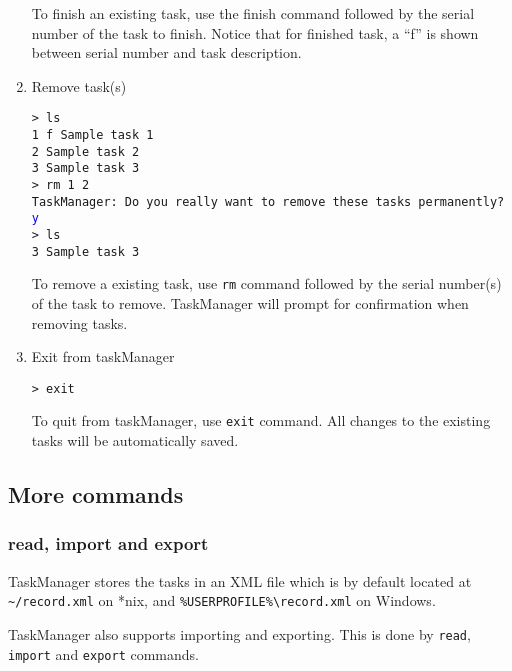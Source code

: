 \documentclass[12pt, a4paper]{article}
\begin{document}
\begin{enumerate}
To finish an existing task, use the finish command followed by the serial number of the task to finish. 
Notice that for finished task, a ``f'' is shown between serial number and task description.

\item Remove task(s)

\texttt{\textgreater \ ls\\
    1 f Sample task 1\\
    2   Sample task 2\\
    3   Sample task 3\\
    \textgreater \ rm 1 2\\
    TaskManager: Do you really want to remove these tasks permanently? \textcolor{blue}{y}\\
    \textgreater \ ls\\
    3   Sample task 3}

To remove a existing task, use \texttt{rm} command followed by the serial number(s) of the task to remove. TaskManager will prompt for confirmation when removing tasks.

\item Exit from taskManager

\texttt{\textgreater \ exit}

To quit from taskManager, use \texttt{exit} command. 
All changes to the existing tasks will be automatically saved.
\end{enumerate}

\subsection{More commands}
\subsubsection{read, import and export}

TaskManager stores the tasks in an XML file which is by default located at
\texttt{\~{}/record.xml} on *nix, and \texttt{\%USERPROFILE\%\textbackslash record.xml} on Windows.

TaskManager also supports importing and exporting. This is done by \texttt{read}, \texttt{import} and \texttt{export} commands.
\end{document}
